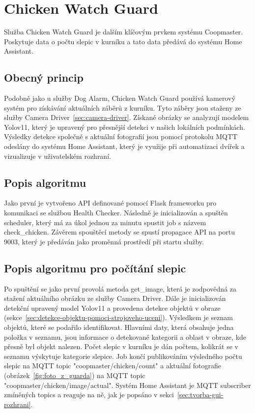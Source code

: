 \section{Chicken Watch Guard}\label{sec:chicken-watch-guard}
Služba Chicken Watch Guard je dalším klíčovým prvkem systému Coopmaster.
Poskytuje data o počtu slepic v kurníku a tato data předává do systému Home Assistant.\newline

\subsection*{Obecný princip}
Podobně jako u služby Dog Alarm, Chicken Watch Guard používá kamerový systém pro získávání aktuálních záběrů z kurníku.
Tyto záběry jsou staženy ze služby Camera Driver~\ref{sec:camera-driver}.
Získané obrázky se analyzují modelem Yolov11, který je upravený pro přesnější detekci v našich lokálních podmínkách.
Výsledky detekce společně s aktuální fotografií jsou pomocí protokolu MQTT odeslány do systému Home Assistant, který je využije při automatizaci dvířek a vizualizuje v uživatelském rozhraní.

\subsection*{Popis algoritmu}
Jako první je vytvořeno API definované pomocí Flask frameworku pro komunikaci se službou Health Checker.
Následně je inicializován a spuštěn scheduler, který má za úkol jednou za minutu spustit job s názvem check\_chicken.
Závěrem spouštěcí metody se spustí propagace API na portu 9003, který je předáván jako proměnná prostředí při startu služby.

\subsection*{Popis algoritmu pro počítání slepic}
Po spuštění se jako první provolá metoda get\_image, která je zodpovědná za stažení aktuálního obrázku ze služby Camera Driver.
Dále je inicializován detekční upravený model Yolov11 a provedena detekce objektů v obraze (sekce~\ref{sec:detekce-objektu-pomoci-strojoveho-uceni}).
Výsledkem je seznam objektů, které se podařilo identifikovat.
Hlavními daty, která obsahuje jedna položka v seznamu, jsou informace o detekované kategorii a oblast v obraze, kde přesně byl objekt nalezen.
Počet slepic v kurníku je dán počtem, kolikrát se v seznamu výskytuje kategorie slepice.
Job končí publikováním výsledného počtu slepic na MQTT topic "coopmaster/chicken/count"
 a aktuální fotografie (obrázek~\ref{fig:foto_z_guarda}) na MQTT topic "coopmaster/chicken/image/actual".
Systém Home Assistant je MQTT subscriber zmíněných topics a reaguje na ně, jak je popsáno v sekci~\ref{sec:tvorba-gui-rozhrani}.

